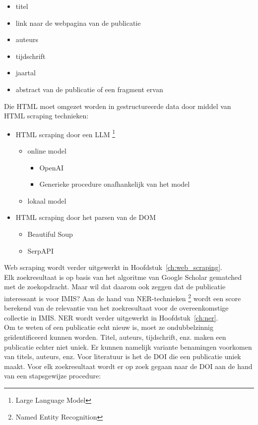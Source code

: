 \begin{itemize}
    \item titel
    \item link naar de webpagina van de publicatie
    \item auteurs
    \item tijdschrift
    \item jaartal
    \item abstract van de publicatie of een fragment ervan
\end{itemize}
Die HTML moet omgezet worden in gestructureerde data door middel van HTML scraping technieken:
\begin{itemize}
    \item HTML scraping door een LLM \footnote{Large Language Model}
    \begin{itemize}
        \item online model
        \begin{itemize}
            \item OpenAI
            \item Generieke procedure onafhankelijk van het model
        \end{itemize}
        \item lokaal model
    \end{itemize}
    \item HTML scraping door het parsen van de DOM
    \begin{itemize}
        \item Beautiful Soup
        \item SerpAPI
    \end{itemize}
\end{itemize}
Web scraping wordt verder uitgewerkt in Hoofdstuk~\ref{ch:web_scraping}.\\
Elk zoekresultaat is op basis van het algoritme van Google Scholar gematched met de zoekopdracht. Maar wil dat daarom ook zeggen dat de publicatie interessant is voor IMIS? Aan de hand van NER-technieken \footnote{Named Entity Recognition} wordt een score berekend van de relevantie van het zoekresultaat voor de overeenkomstige collectie in IMIS. NER wordt verder uitgewerkt in Hoofdstuk~\ref{ch:ner}.\\
Om te weten of een publicatie echt nieuw is, moet ze ondubbelzinnig geïdentificeerd kunnen worden. Titel, auteurs, tijdschrift, enz. maken een publicatie echter niet uniek. Er kunnen namelijk variante benamingen voorkomen van titels, auteurs, enz. Voor literatuur is het de DOI die een publicatie uniek maakt. Voor elk zoekresultaat wordt er op zoek gegaan naar de DOI aan de hand van een stapsgewijze procedure:
